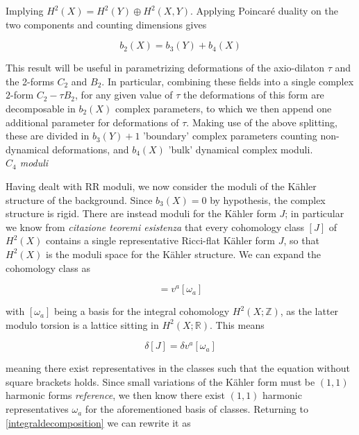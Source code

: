 \documentclass[11pt,a4paper,oneside,openright,titlepage]{book}
\newcommand{\cmmnt}[1]{\textcolor{Mahogany}{\emph{#1}}}
\begin{document}
Implying $H^2(X) = H^2(Y) \oplus H^2(X,Y)$. Applying Poincaré duality on the two components and counting dimensions gives

\begin{equation}
	b_2(X) = b_3(Y) + b_4(X)
\end{equation}

This result will be useful in parametrizing deformations of the axio-dilaton $\tau$ and the 2-forms $C_2$ and $B_2$. In particular, combining these fields into a single complex $2$-form $C_2 - \tau B_2$, for any given value of $\tau$ the deformations of this form are decomposable in $b_2(X)$ complex parameters, to which we then append one additional parameter for deformations of $\tau$. Making use of the above splitting, these are divided in $b_3(Y) + 1$ 'boundary' complex parameters counting non-dynamical deformations, and $b_4(X)$ 'bulk' dynamical complex moduli.\\

\cmmnt{$C_4$ moduli}

Having dealt with RR moduli, we now consider the moduli of the K\"ahler structure of the background. Since $b_3(X) = 0$ by hypothesis, the complex structure is rigid. There are instead moduli for the K\"ahler form $J$; in particular we know from \cmmnt{citazione teoremi esistenza} that every cohomology class $[J]$ of $H^2(X)$ contains a single representative Ricci-flat K\"ahler form $J$, so that $H^2(X)$ is the moduli space for the K\"ahler structure. We can expand the cohomology class as

\begin{equation}
	[J] = v^a [\omega_a] \label{integraldecomposition}
\end{equation}

with $[\omega_a]$ being a basis for the integral cohomology $H^2(X;\mathbb Z)$, as the latter modulo torsion is a lattice sitting in $H^2(X;\mathbb R)$. This means

\begin{equation}
	\delta [J] = \delta v^a [\omega_a]
\end{equation}

meaning there exist representatives in the classes such that the equation without square brackets holds. Since small variations of the K\"ahler form must be $(1,1)$ harmonic forms \cmmnt{reference}, we then know there exist $(1,1)$ harmonic representatives $\omega_a$ for the aforementioned basis of classes. Returning to \ref{integraldecomposition} we can rewrite it as
\end{document}
